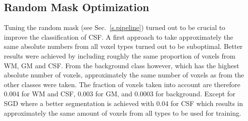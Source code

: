 \documentclass[journal]{IEEEtran}
\begin{document}
\subsection{Random Mask Optimization}

Tuning the random mask (see Sec.~\ref{s.pipeline}) turned out to be crucial to improve the classification of CSF. A first approach to take approximately the same absolute numbers from all voxel types turned out to be suboptimal. Better results were achieved by including roughly the same proportion of voxels from WM, GM and CSF. From the background class however, which has the highest absolute number of voxels, approximately the same number of voxels as from the other classes were taken. The fraction of voxels taken into account are therefore 0.004 for WM and CSF, 0.003 for GM, and 0.0003 for background. Except for SGD where a better segmentation is achieved with 0.04 for CSF which results in approximately the same amount of voxels from all types to be used for training.
\end{document}
